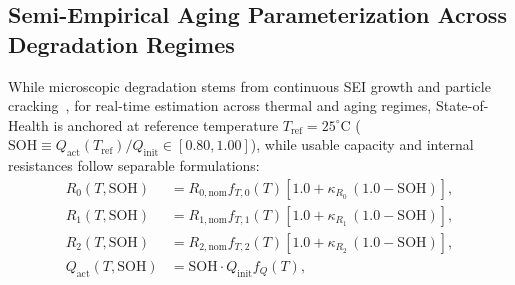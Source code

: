 \documentclass[preprint,12pt]{elsarticle}
\begin{document}
\subsection{Semi-Empirical Aging Parameterization Across Degradation Regimes}
While microscopic degradation stems from continuous SEI growth and particle cracking~\cite{Birkl2017diagnostics,Ren2019aging}, for real-time estimation across thermal and aging regimes, State-of-Health is anchored at reference temperature $T_{\text{ref}} = 25^\circ\text{C}$ ($\text{SOH} \equiv Q_{\text{act}}(T_{\text{ref}})/Q_{\text{init}} \in [0.80, 1.00]$), while usable capacity and internal resistances follow separable formulations:
\begin{align}
R_0(T, \text{SOH}) &= R_{0,\text{nom}} f_{T,0}(T) [1.0 + \kappa_{R_0}\,(1.0 - \text{SOH})], \label{eqn:aging_r0}\\
R_1(T, \text{SOH}) &= R_{1,\text{nom}} f_{T,1}(T) [1.0 + \kappa_{R_1}\,(1.0 - \text{SOH})], \label{eqn:aging_r1}\\
R_2(T, \text{SOH}) &= R_{2,\text{nom}} f_{T,2}(T) [1.0 + \kappa_{R_2}\,(1.0 - \text{SOH})], \label{eqn:aging_r2}\\
Q_{\text{act}}(T, \text{SOH}) &= \text{SOH} \cdot Q_{\text{init}} f_Q(T), \label{eqn:aging_q}
\end{align}
\end{document}
